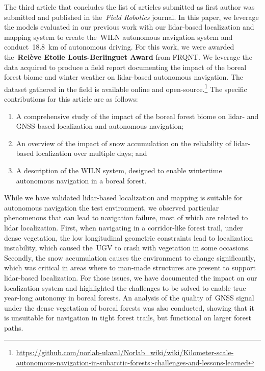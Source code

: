 The third article that concludes the list of articles submitted as first author was submitted and published in the~\emph{Field Robotics} journal.
In this paper, we leverage the models evaluated in our previous work with our lidar-based localization and mapping system to create the~\ac{WILN} autonomous navigation system and conduct~\SI{18.8}{\kilo\meter} of autonomous driving.
For this work, we were awarded the~\textbf{Relève Etoile Louis-Berlinguet Award} from FRQNT.
We leverage the data acquired to produce a field report documenting the impact of the boreal forest biome and winter weather on lidar-based autonomous navigation.
The dataset gathered in the field is available online and open-source.\footnote{\textwidth\url{https://github.com/norlab-ulaval/Norlab_wiki/wiki/Kilometer-scale-autonomous-navigation-in-subarctic-forests:-challenges-and-lessons-learned}}
The specific contributions for this article are as follows:
\begin{enumerate}
	\item A comprehensive study of the impact of the boreal forest biome on lidar- and \ac{GNSS}-based localization and autonomous navigation;  
	\item An overview of the impact of snow accumulation on the reliability of lidar-based localization over multiple days; and
	\item A description of the \ac{WILN} system, designed to enable wintertime autonomous navigation in a boreal forest.
\end{enumerate}
While we have validated lidar-based localization and mapping is suitable for autonomous navigation the test environment, we observed particular phenomenons that can lead to navigation failure, most of which are related to lidar localization.
First, when navigating in a corridor-like forest trail, under dense vegetation, the low longitudinal geometric constraints lead to localization instability, which caused the~\ac{UGV} to crash with vegetation in some occasions.
Secondly, the snow accumulation causes the environment to change significantly, which was critical in areas where to man-made structures are present to support lidar-based localization.
For those issues, we have documented the impact on our localization system and highlighted the challenges to be solved to enable true year-long autonomy in boreal forests.
An analysis of the quality of~\ac{GNSS} signal under the dense vegetation of boreal forests was also conducted, showing that it is unsuitable for navigation in tight forest trails, but functional on larger forest paths.

